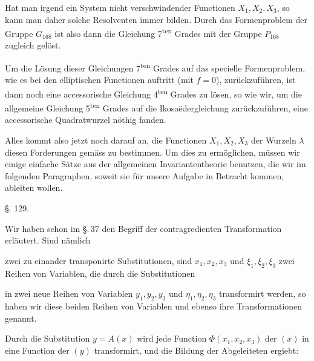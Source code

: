 Hat man irgend ein System nicht verschwindender Functionen $X_1, X_2, X_3$, so kann man daher solche Resolventen immer bilden. Durch das Formenproblem der Gruppe $G_{168}$ ist also dann die Gleichung 7\textsuperscript{ten} Grades mit der Gruppe $P_{168}$ zugleich gelöst.

Um die Lösung dieser Gleichungen 7\textsuperscript{ten} Grades auf das specielle Formenproblem, wie es bei den elliptischen Functionen auftritt (mit $f = 0$), zurückzuführen, ist dann noch eine accessorische Gleichung 4\textsuperscript{ten} Grades zu lösen, so wie wir, um die allgemeine Gleichung 5\textsuperscript{ten} Grades auf die Ikosaëdergleichung zurückzuführen, eine accessorische Quadratwurzel n\"othig fanden.

Alles kommt also jetzt noch darauf an, die Functionen $X_1, X_2, X_3$ der Wurzeln $\lambda$ diesen Forderungen gemäss zu bestimmen. Um dies zu ermöglichen, müssen wir einige einfache Sätze aus der allgemeinen Invariantentheorie benutzen, die wir im folgenden Paragraphen, soweit sie für unsere Aufgabe in Betracht kommen, ableiten wollen.

\begin{center}
§. 129.

\end{center}

Wir haben schon im §.\,37 den Begriff der contragredienten Transformation erläutert. Sind nämlich


zwei zu einander transponirte Substitutionen, sind $x_1, x_2, x_3$ und $\xi_1, \xi_2, \xi_3$ zwei Reihen von Variablen, die durch die Substitutionen


in zwei neue Reihen von Variablen $y_1, y_2, y_3$ und $\eta_1, \eta_2, \eta_3$ transformirt werden, so haben wir diese beiden Reihen von Variablen und ebenso ihre Transformationen  genannt.

Durch die Substitution $y = A(x)$ wird jede Function $\Phi(x_1, x_2, x_3)$ der $(x)$ in eine Function der $(y)$ transformirt, und die Bildung der Abgeleiteten ergiebt:

